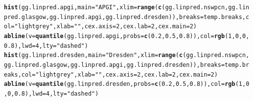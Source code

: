 \documentclass{article}\usepackage[]{graphicx}\usepackage[]{color}
\makeatletter
\newcommand{\hlnum}[1]{\textcolor[rgb]{0.686,0.059,0.569}{#1}}%
\newcommand{\hlstr}[1]{\textcolor[rgb]{0.192,0.494,0.8}{#1}}%
\newcommand{\hlstd}[1]{\textcolor[rgb]{0.345,0.345,0.345}{#1}}%
\newcommand{\hlkwc}[1]{\textcolor[rgb]{0.333,0.667,0.333}{#1}}%
\newcommand{\hlkwd}[1]{\textcolor[rgb]{0.737,0.353,0.396}{\textbf{#1}}}%
\newenvironment{kframe}{%
 \def\at@end@of@kframe{}%
 \ifinner\ifhmode%
  \def\at@end@of@kframe{\end{minipage}}%
  \begin{minipage}{\columnwidth}%
 \fi\fi%
 \def\FrameCommand##1{\hskip\@totalleftmargin \hskip-\fboxsep
 \colorbox{shadecolor}{##1}\hskip-\fboxsep
     \hskip-\linewidth \hskip-\@totalleftmargin \hskip\columnwidth}%
 \MakeFramed {\advance\hsize-\width
   \@totalleftmargin\z@ \linewidth\hsize
   \@setminipage}}%
 {\par\unskip\endMakeFramed%
 \at@end@of@kframe}
\newenvironment{knitrout}{}{} %
\makeatother
\begin{document}
\begin{knitrout}
\begin{kframe}
\begin{alltt}
\hlkwd{hist}\hlstd{(gg.linpred.apgi,} \hlkwc{main} \hlstd{=} \hlstr{"APGI"}\hlstd{,} \hlkwc{xlim} \hlstd{=} \hlkwd{range}\hlstd{(}\hlkwd{c}\hlstd{(gg.linpred.nswpcn, gg.linpred.glasgow, gg.linpred.apgi, gg.linpred.dresden)),} \hlkwc{breaks} \hlstd{= temp.breaks,} \hlkwc{col} \hlstd{=} \hlstr{"lightgrey"}\hlstd{,} \hlkwc{xlab} \hlstd{=} \hlstr{""}\hlstd{,} \hlkwc{cex.axis} \hlstd{=} \hlnum{2}\hlstd{,} \hlkwc{cex.lab} \hlstd{=} \hlnum{2}\hlstd{,} \hlkwc{cex.main} \hlstd{=} \hlnum{2}\hlstd{)}
\hlkwd{abline}\hlstd{(}\hlkwc{v} \hlstd{=} \hlkwd{quantile}\hlstd{(gg.linpred.apgi,} \hlkwc{probs} \hlstd{=} \hlkwd{c}\hlstd{(}\hlnum{0.2}\hlstd{,} \hlnum{0.5}\hlstd{,} \hlnum{0.8}\hlstd{)),} \hlkwc{col} \hlstd{=} \hlkwd{rgb}\hlstd{(}\hlnum{1}\hlstd{,} \hlnum{0}\hlstd{,} \hlnum{0}\hlstd{,} \hlnum{0.8}\hlstd{),} \hlkwc{lwd} \hlstd{=} \hlnum{4}\hlstd{,} \hlkwc{lty} \hlstd{=} \hlstr{"dashed"}\hlstd{)}
\hlkwd{hist}\hlstd{(gg.linpred.dresden,} \hlkwc{main} \hlstd{=} \hlstr{"Dresden"}\hlstd{,} \hlkwc{xlim} \hlstd{=} \hlkwd{range}\hlstd{(}\hlkwd{c}\hlstd{(gg.linpred.nswpcn, gg.linpred.glasgow, gg.linpred.apgi, gg.linpred.dresden)),} \hlkwc{breaks} \hlstd{= temp.breaks,} \hlkwc{col} \hlstd{=} \hlstr{"lightgrey"}\hlstd{,} \hlkwc{xlab} \hlstd{=} \hlstr{""}\hlstd{,} \hlkwc{cex.axis} \hlstd{=} \hlnum{2}\hlstd{,} \hlkwc{cex.lab} \hlstd{=} \hlnum{2}\hlstd{,} \hlkwc{cex.main} \hlstd{=} \hlnum{2}\hlstd{)}
\hlkwd{abline}\hlstd{(}\hlkwc{v} \hlstd{=} \hlkwd{quantile}\hlstd{(gg.linpred.dresden,} \hlkwc{probs} \hlstd{=} \hlkwd{c}\hlstd{(}\hlnum{0.2}\hlstd{,} \hlnum{0.5}\hlstd{,} \hlnum{0.8}\hlstd{)),} \hlkwc{col} \hlstd{=} \hlkwd{rgb}\hlstd{(}\hlnum{1}\hlstd{,} \hlnum{0}\hlstd{,} \hlnum{0}\hlstd{,} \hlnum{0.8}\hlstd{),} \hlkwc{lwd} \hlstd{=} \hlnum{4}\hlstd{,} \hlkwc{lty} \hlstd{=} \hlstr{"dashed"}\hlstd{)}
\end{alltt}
\end{kframe}


\end{knitrout}
\end{document}
